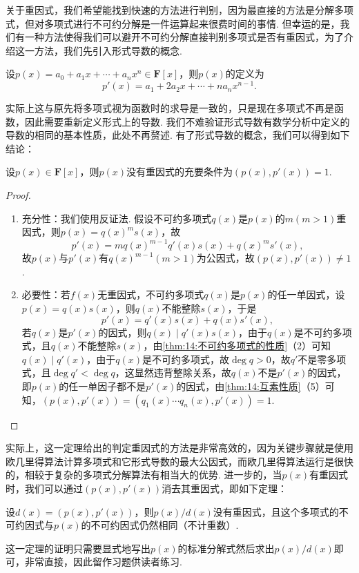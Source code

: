 关于重因式，我们希望能找到快速的方法进行判别，因为最直接的方法是分解多项式，但对多项式进行不可约分解是一件运算起来很费时间的事情. 但幸运的是，我们有一种方法使得我们可以避开不可约分解直接判别多项式是否有重因式，为了介绍这一方法，我们先引入形式导数的概念.
\begin{definition}
    设$p(x)=a_0+a_1x+\cdots+a_nx^n\in\mathbf{F}[x]$，则$p(x)$的定义为
    \[p'(x)=a_1+2a_2x+\cdots+na_nx^{n-1}.\]
\end{definition}
实际上这与原先将多项式视为函数时的求导是一致的，只是现在多项式不再是函数，因此需要重新定义形式上的导数. 我们不难验证形式导数有数学分析中定义的导数的相同的基本性质，此处不再赘述. 有了形式导数的概念，我们可以得到如下结论：
\begin{theorem} \label{thm:14:重因式的判别}
    设$p(x)\in\mathbf{F}[x]$，则$p(x)$没有重因式的充要条件为$(p(x),p'(x))=1$.
\end{theorem}
\begin{proof}
    \begin{enumerate}
        \item 充分性：我们使用反证法. 假设不可约多项式$q(x)$是$p(x)$的$m(m>1)$重因式，则$p(x)=q(x)^ms(x)$，故
        \[p'(x)=mq(x)^{m-1}q'(x)s(x)+q(x)^ms'(x),\]
        故$p(x)$与$p'(x)$有$q(x)^{m-1}(m>1)$为公因式，故$(p(x),p'(x))\neq 1$.
        \item 必要性：若$f(x)$无重因式，不可约多项式$q(x)$是$p(x)$的任一单因式，设$p(x)=q(x)s(x)$，则$q(x)$不能整除$s(x)$，于是
        \[p'(x)=q'(x)s(x)+q(x)s'(x),\]
        若$q(x)$是$p'(x)$的因式，则$q(x)\mid q'(x)s(x)$，由于$q(x)$是不可约多项式，且$q(x)$不能整除$s(x)$，由\autoref{thm:14:不可约多项式的性质}（2）可知$q(x)\mid q'(x)$，由于$q(x)$是不可约多项式，故$\deg q>0$，故$q'$不是零多项式，且$\deg q'<\deg q$，这显然违背整除关系，故$q(x)$不是$p'(x)$的因式，即$p(x)$的任一单因子都不是$p'(x)$的因式，由\autoref{thm:14:互素性质}（5）可知，$(p(x),p'(x))=(q_1(x)\cdots q_n(x),p'(x))=1$.
    \end{enumerate}
\end{proof}

实际上，这一定理给出的判定重因式的方法是非常高效的，因为关键步骤就是使用欧几里得算法计算多项式和它形式导数的最大公因式，而欧几里得算法运行是很快的，相较于复杂的多项式分解算法有相当大的优势. 进一步的，当$p(x)$有重因式时，我们可以通过$(p(x),p'(x))$消去其重因式，即如下定理：
\begin{theorem} \label{thm:14:消去重因式}
    设$d(x)=(p(x),p'(x))$，则$p(x)/d(x)$没有重因式，且这个多项式的不可约因式与$p(x)$的不可约因式仍然相同（不计重数）.
\end{theorem}
这一定理的证明只需要显式地写出$p(x)$的标准分解式然后求出$p(x)/d(x)$即可，非常直接，因此留作习题供读者练习.

